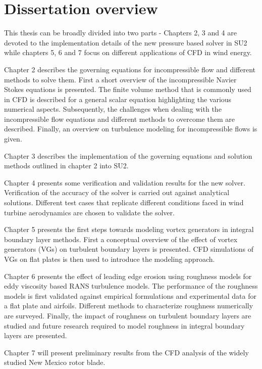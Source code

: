 \section{Dissertation overview}
This thesis can be broadly divided into two parts - Chapters 2, 3 and 4 are devoted to the implementation details of the new pressure based solver in SU2 while chapters 5, 6 and 7 focus on different applications of CFD in wind energy. 

Chapter 2 describes the governing equations for incompressible flow and different methods to solve them. First a short overview of the incompressible Navier Stokes equations is presented. The finite volume method that is commonly used in CFD is described for a general scalar equation highlighting the various numerical aspects. Subsequently, the challenges when dealing with the incompressible flow equations and different methods to overcome them are described. Finally, an overview on turbulence modeling for incompressible flows is given.

Chapter 3 describes the implementation of the governing equations and solution methods outlined in chapter 2 into SU2. 

Chapter 4 presents some verification and validation results for the new solver. Verification of the accuracy of the solver is carried out against analytical solutions. Different test cases that replicate different conditions faced in wind turbine aerodynamics are chosen to validate the solver. 

Chapter 5 presents the first steps towards modeling vortex generators in integral boundary layer methods. First a conceptual overview of the effect of vortex generators (VGs) on turbulent boundary layers is presented. CFD simulations of VGs on flat plates is then used to introduce the modeling approach. 

Chapter 6 presents the effect of leading edge erosion using roughness models for eddy viscosity based RANS turbulence models. The performance of the roughness models is first validated against empirical formulations and experimental data for a flat plate and airfoils. Different methods to characterize roughness numerically are surveyed. Finally, the impact of roughness on turbulent boundary layers are studied and future research required to model roughness in integral boundary layers are presented. 

Chapter 7 will present preliminary results from the CFD analysis of the widely studied New Mexico rotor blade.

